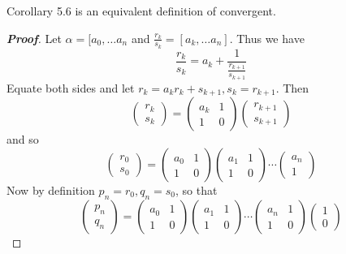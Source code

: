 \begin{lemma} Corollary 5.6 is an equivalent definition of convergent.
\end{lemma}
\begin{proof}[\bf Proof] Let $\alpha=[a_0,\ldots a_n$ and $\frac{r_k}{s_k}=[a_k,\ldots a_n]$.
Thus we have $$\frac{r_k}{s_k}=a_k+\frac{1}{\frac{r_{k+1}}{s_{k+1}}}$$
Equate both sides and let $r_k=a_k r_k+s_{k+1},s_k=r_{k+1}$.
Then
$$\begin{pmatrix} r_k \\ s_k \end{pmatrix} = \begin{pmatrix} a_k & 1\\ 1 & 0 \end{pmatrix}
\begin{pmatrix} r_{k+1}\\ s_{k+1} \end{pmatrix}$$
and so
$$\begin{pmatrix} r_0 \\ s_0 \end{pmatrix} = \begin{pmatrix} a_0 & 1\\ 1 & 0 \end{pmatrix}
\begin{pmatrix} a_1 & 1\\ 1 & 0 \end{pmatrix} \cdots \begin{pmatrix} a_n \\ 1 \end{pmatrix}$$
Now by definition $p_n=r_0,q_n=s_0$, so that
$$\begin{pmatrix} p_n \\ q_n \end{pmatrix} = \begin{pmatrix} a_0 & 1\\ 1 & 0 \end{pmatrix}
\begin{pmatrix} a_1 & 1\\ 1 & 0 \end{pmatrix} \cdots
\begin{pmatrix} a_n & 1\\ 1&0 \end{pmatrix} \begin{pmatrix} 1 \\ 0 \end{pmatrix}$$


\end{proof}
